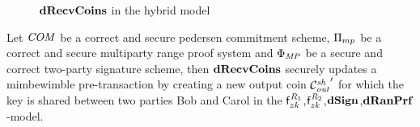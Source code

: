 \begin{figure}
    \caption{$\mathbf{dRecvCoins}$ in the hybrid model} \label{fig:atom:hybrid-drecv}
\end{figure}

\begin{theorem}
    \label{teo:atom:sec-drecv}
    Let $\mathit{COM}$ be a correct and secure pedersen commitment scheme, $\Pi_{mp}$ be a correct and secure multiparty range proof system and $\Phi_{\mathit{MP}}$ be a secure and correct two-party signature scheme, then $\mathbf{dRecvCoins}$ securely updates a mimbewimble pre-transaction by creating a new output coin ${\mathcal{C}_{\mathit{out}}^{\mathit{sh}}}'$ for which the key is shared between two parties Bob and Carol in the $\mathsf{f}^{\mathit{R}_1}_{zk}$,$\mathsf{f}^{\mathit{R}_2}_{zk}$,$\mathbf{dSign}$,$\mathbf{dRanPrf}$-model.
\end{theorem}

